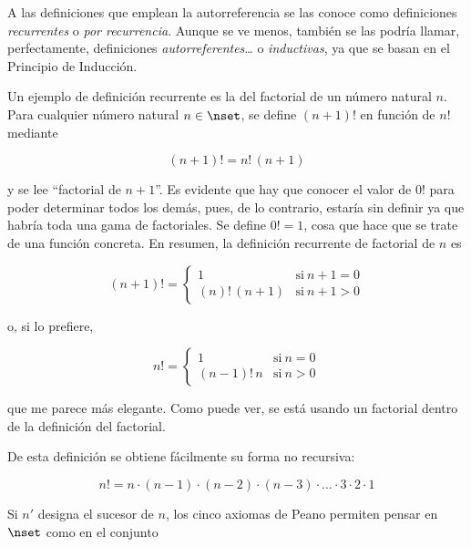 
A las definiciones que emplean la autorreferencia se las conoce como
definiciones \emph{recurrentes} o \emph{por recurrencia}. Aunque se ve
menos, también se las podría llamar, perfectamente, definiciones
\emph{autorreferentes}\dots{} o \emph{inductivas}, ya que se basan en el
Principio de Inducción.

Un ejemplo de definición recurrente es la del factorial de un número natural
$n$. Para cualquier número natural $n \in \nset$, se define $(n + 1)!$ en
función de $n!$ mediante

$$ (n + 1)! = n! \, (n + 1) $$

\noindent y se lee ``factorial de $n + 1$''. Es evidente que hay que conocer
el valor de $0!$ para poder determinar todos los demás, pues, de lo
contrario, estaría sin definir ya que habría toda una gama de factoriales.
Se define $0! = 1$, cosa que hace que se trate de una función concreta. En
resumen, la definición recurrente de factorial de $n$ es

\begin{equation*}
  (n+1)! =
  \begin{cases}
    1             & \text{si}\ n + 1 = 0 \\
    (n)!\,(n+1)   & \text{si}\ n + 1 > 0
  \end{cases}
\end{equation*}

\noindent o, si lo prefiere,

\begin{equation*}
  n! =
  \begin{cases}
    1           & \text{si}\ n = 0 \\
    (n-1)!\,n   & \text{si}\ n > 0
  \end{cases}
\end{equation*}

\noindent que me parece más elegante. Como puede ver, se está usando un
factorial dentro de la definición del factorial.

De esta definición se obtiene fácilmente su forma no recursiva:


\[ n! = n \cdot (n-1) \cdot (n-2) \cdot (n-3) \cdot \dots \cdot 3 \cdot 2
\cdot 1 \]

Si $n'$ designa el sucesor de $n$, los cinco axiomas de Peano permiten
pensar en $\nset$ como en el conjunto

